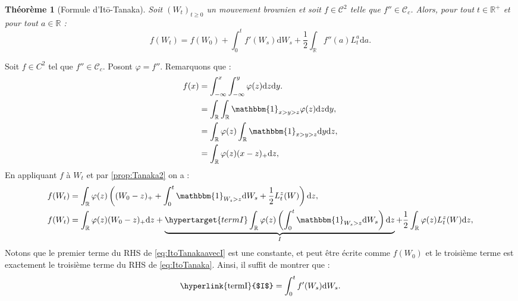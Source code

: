 \documentclass[openany]{book}
\makeatletter
\newcommand{\R}{\mathbb{R}}
\newcommand{\1}{\mathbbm{1}}
\renewcommand{\d}{\mathrm{d}}
\renewenvironment{proof}[1][\textbf{\textit{Démonstration}}]{%
  \par\pushQED{\qed}%
  \normalfont\topsep6\p@\@plus6\p@\relax
  \trivlist\item[\hskip\labelsep
    #1\@addpunct{.}]\ignorespaces
}{%
  \popQED\endtrivlist\@endpefalse
}
\theoremstyle{thmfont}
\newtheorem{theorem}{Théorème}[chapter]
\theoremstyle{deffont}
\theoremstyle{thmfont}
\theoremstyle{deffont}
\makeatother
\begin{document}
\begin{theorem}[Formule d'Itō-Tanaka]
  Soit $(W_t)_{t\geq0}$ un mouvement brownien et soit $f \in \mathcal C^2$ telle que $f'' \in \mathcal C_c$. Alors, pour tout $t \in \R^+$ et pour tout $a \in \R$ :
  \begin{equation}
    f(W_t) = f(W_0) + \int_0^tf'(W_s) \d W_s + \dfrac{1}{2} \int_\R f''(a) L_t^a \d a.
    \label{eq:ItoTanaka}
  \end{equation}
\end{theorem}

\begin{proof} Soit $f \in C^2$ tel que $f'' \in \mathcal C_c$. Posont $\varphi = f''$. %
Remarquons que :
  \begin{align*}
    f(x) &= \int_{-\infty}^x \int_{-\infty}^y \varphi(z) \d z \d y.\\
    &= \int_\R\int_\R \1_{x > y > z} \varphi(z) \d z \d y,\\
    &= \int_\R\varphi(z) \int_\R \1_{x > y > z} \d y \d z,\\
    &= \int_\R\varphi(z) (x - z)_+ \d z,
  \end{align*}
  En appliquant $f$ à $W_t$ et par \autoref{prop:Tanaka2} on a :
  \begin{align}
   f(W_t) &= \int_\R\varphi(z) \left( (W_0-z)_+  + \int_0^t \1_{W_s>z}\d W_s + \dfrac{1}{2} L_t^z(W) \right)\d z,\notag \\
   f(W_t) &= \int_\R\varphi(z) (W_0-z)_+ \d z 
            + \underbrace{\hypertarget{termI} \int_\R \varphi(z) \left(\int_0^t \1_{W_s>z}\d W_s \right)\d z}_{I}
            + \dfrac{1}{2} \int_\R \varphi(z) L_t^z(W)\d z,\label{eq:ItoTanakaavecI}
  \end{align}
  Notons que le premier terme du RHS de \eqref{eq:ItoTanakaavecI} est une constante, et peut être écrite comme $f(W_0)$ et le troisième terme est exactement le troisième terme du RHS de \eqref{eq:ItoTanaka}. Ainsi, il suffit de montrer que :
  $$\text{\hyperlink{termI}{$I$}} = \int_0^t f'(W_s) \d W_s.$$


\end{proof}
\end{document}
